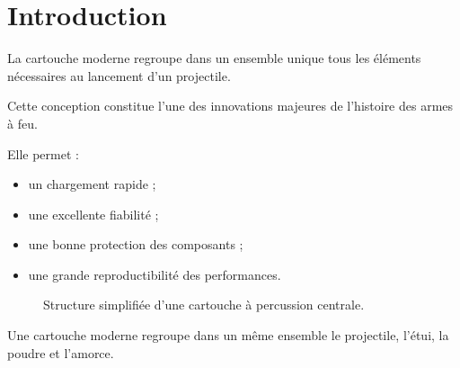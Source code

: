
\section{Introduction}

La cartouche moderne regroupe dans un ensemble unique tous les éléments
nécessaires au lancement d'un projectile.

Cette conception constitue l'une des innovations majeures de l'histoire des
armes à feu.

Elle permet :

\begin{itemize}
    \item un chargement rapide ;
    \item une excellente fiabilité ;
    \item une bonne protection des composants ;
    \item une grande reproductibilité des performances.
\end{itemize}

\begin{figure}[htbp]
\centering
{}
\caption{Structure simplifiée d'une cartouche à percussion centrale.}
\label{fig:cartouche_generale}
\end{figure}

\begin{aretenir}

Une cartouche moderne regroupe dans un même ensemble le projectile, l'étui,
la poudre et l'amorce.

\end{aretenir}


